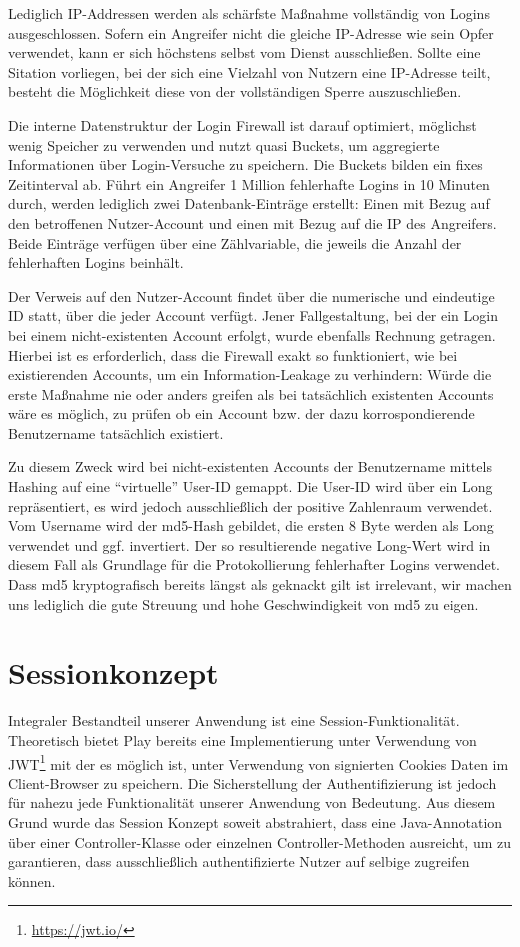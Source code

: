 \documentclass[12pt,DIV14,BCOR10mm,a4paper,twoside,parskip=half-,headsepline,headinclude,english,ngerman,bibliography=totocnumbered]{scrreprt}
\begin{document}
Lediglich IP-Addressen werden als schärfste Maßnahme vollständig von Logins ausgeschlossen. Sofern ein Angreifer nicht die gleiche IP-Adresse wie sein Opfer verwendet, kann er sich höchstens selbst vom Dienst ausschließen. Sollte eine Sitation vorliegen, bei der sich eine Vielzahl von Nutzern eine IP-Adresse teilt, besteht die Möglichkeit diese von der vollständigen Sperre auszuschließen.

Die interne Datenstruktur der Login Firewall ist darauf optimiert, möglichst wenig Speicher zu verwenden und nutzt quasi Buckets, um aggregierte Informationen über Login-Versuche zu speichern. Die Buckets bilden ein fixes Zeitinterval ab. Führt ein Angreifer 1 Million fehlerhafte Logins in 10 Minuten durch, werden lediglich zwei Datenbank-Einträge erstellt: Einen mit Bezug auf den betroffenen Nutzer-Account und einen mit Bezug auf die IP des Angreifers. Beide Einträge verfügen über eine Zählvariable, die jeweils die Anzahl der fehlerhaften Logins beinhält.

Der Verweis auf den Nutzer-Account findet über die numerische und eindeutige ID statt, über die jeder Account verfügt. Jener Fallgestaltung, bei der ein Login bei einem nicht-existenten Account erfolgt, wurde ebenfalls Rechnung getragen. Hierbei ist es erforderlich, dass die Firewall exakt so funktioniert, wie bei existierenden Accounts, um ein Information-Leakage zu verhindern: Würde die erste Maßnahme nie oder anders greifen als bei tatsächlich existenten Accounts wäre es möglich, zu prüfen ob ein Account bzw. der dazu korrospondierende Benutzername tatsächlich existiert.

Zu diesem Zweck wird bei nicht-existenten Accounts der Benutzername mittels Hashing auf eine ``virtuelle'' User-ID gemappt. Die User-ID wird über ein Long repräsentiert, es wird jedoch ausschließlich der positive Zahlenraum verwendet. Vom Username wird der md5-Hash gebildet, die ersten 8 Byte werden als Long verwendet und ggf. invertiert. Der so resultierende negative Long-Wert wird in diesem Fall als Grundlage für die Protokollierung fehlerhafter Logins verwendet. Dass md5 kryptografisch bereits längst als geknackt gilt ist irrelevant, wir machen uns lediglich die gute Streuung und hohe Geschwindigkeit von md5 zu eigen.

\section{Sessionkonzept}
Integraler Bestandteil unserer Anwendung ist eine Session-Funktionalität. Theoretisch bietet Play bereits eine Implementierung unter Verwendung von JWT\footnote{\url{https://jwt.io/}} mit der es möglich ist, unter Verwendung von signierten Cookies Daten im Client-Browser zu speichern. Die Sicherstellung der Authentifizierung ist jedoch für nahezu jede Funktionalität unserer Anwendung von Bedeutung. Aus diesem Grund wurde das Session Konzept soweit abstrahiert, dass eine Java-Annotation über einer Controller-Klasse oder einzelnen Controller-Methoden ausreicht, um zu garantieren, dass ausschließlich authentifizierte Nutzer auf selbige zugreifen können.
\end{document}
